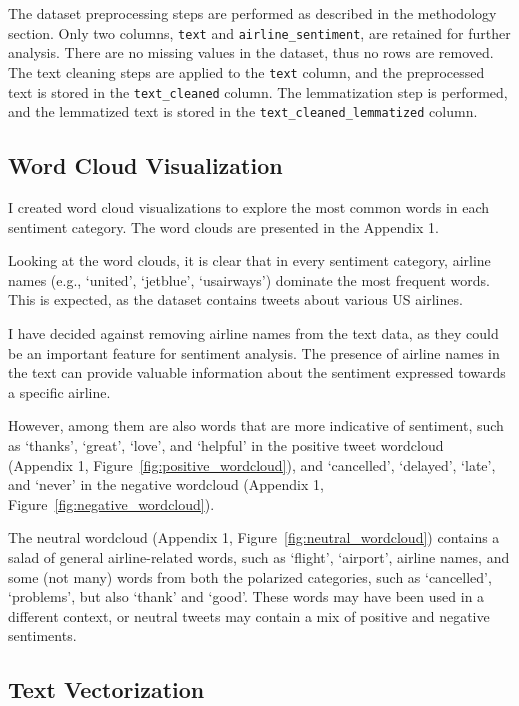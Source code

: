 \documentclass{article}
\begin{document}
The dataset preprocessing steps are performed as described in the methodology section. Only two columns, \texttt{text} and \texttt{airline\_sentiment}, are retained for further analysis. There are no missing values in the dataset, thus no rows are removed. The text cleaning steps are applied to the \texttt{text} column, and the preprocessed text is stored in the \texttt{text\_cleaned} column. The lemmatization step is performed, and the lemmatized text is stored in the \texttt{text\_cleaned\_lemmatized} column.

\subsection{Word Cloud Visualization}

I created word cloud visualizations to explore the most common words in each sentiment category. The word clouds are presented in the Appendix 1.

Looking at the word clouds, it is clear that in every sentiment category, airline names (e.g., `united', `jetblue', `usairways') dominate the most frequent words. This is expected, as the dataset contains tweets about various US airlines.

I have decided against removing airline names from the text data, as they could be an important feature for sentiment analysis. The presence of airline names in the text can provide valuable information about the sentiment expressed towards a specific airline.

However, among them are also words that are more indicative of sentiment, such as `thanks', `great', `love', and `helpful' in the positive tweet wordcloud (Appendix 1, Figure~\ref{fig:positive_wordcloud}), and `cancelled', `delayed', `late', and `never' in the negative wordcloud (Appendix 1, Figure~\ref{fig:negative_wordcloud}).

The neutral wordcloud (Appendix 1, Figure~\ref{fig:neutral_wordcloud}) contains a salad of general airline-related words, such as `flight', `airport', airline names, and some (not many) words from both the polarized categories, such as `cancelled', `problems', but also `thank' and `good'. These words may have been used in a different context, or neutral tweets may contain a mix of positive and negative sentiments.

\subsection{Text Vectorization}
\end{document}
